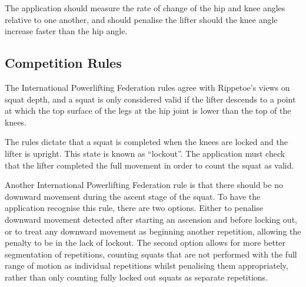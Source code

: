The application should measure the rate of change of the hip and knee angles relative to one another, and should penalise the lifter should the knee angle increase faster than the hip angle.

\subsection{Competition Rules}

The International Powerlifting Federation rules\cite{ipf} agree with Rippetoe's views on squat depth, and a squat is only considered valid if the lifter descends to a point at which the top surface of the legs at the hip joint is lower than the top of the knees.

The rules dictate that a squat is completed when the knees are locked and the lifter is upright. This state is known as ``lockout''. The application must check that the lifter completed the full movement in order to count the squat as valid.

Another International Powerlifting Federation rule is that there should be no downward movement during the ascent stage of the squat. To have the application recognise this rule, there are two options. Either to penalise downward movement detected after starting an ascension and before locking out, or to treat any downward movement as beginning another repetition, allowing the penalty to be in the lack of lockout. The second option allows for more better segmentation of repetitions, counting squats that are not performed with the full range of motion as individual repetitions whilst penalising them appropriately, rather than only counting fully locked out squats as separate repetitions.